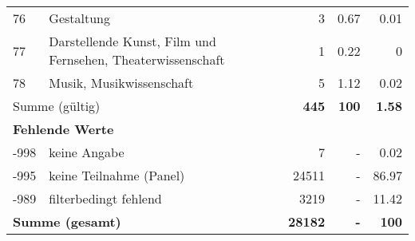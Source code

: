 \begin{longtable}{lXrrr}
        76 & \multicolumn{1}{X}{Gestaltung} & %
          \num{3} &
          \num[round-mode=places,round-precision=2]{0.67} &
          \num[round-mode=places,round-precision=2]{0.01} \\

        77 & \multicolumn{1}{X}{Darstellende Kunst, Film und Fernsehen, Theaterwissenschaft} & %
          \num{1} &
          \num[round-mode=places,round-precision=2]{0.22} &
          \num[round-mode=places,round-precision=2]{0} \\

        78 & \multicolumn{1}{X}{Musik, Musikwissenschaft} & %
          \num{5} &
          \num[round-mode=places,round-precision=2]{1.12} &
          \num[round-mode=places,round-precision=2]{0.02} \\

     \midrule
     \multicolumn{2}{l}{Summe (gültig)} &
       \textbf{\num{445}} &
     \textbf{\num{100}} &
       \textbf{\num[round-mode=places,round-precision=2]{1.58}} \\
     \multicolumn{5}{l}{\textbf{Fehlende Werte}}\\
       -998 &
       keine Angabe &
         \num{7} &
        - &
         \num[round-mode=places,round-precision=2]{0.02} \\
       -995 &
       keine Teilnahme (Panel) &
         \num{24511} &
        - &
         \num[round-mode=places,round-precision=2]{86.97} \\
       -989 &
       filterbedingt fehlend &
         \num{3219} &
        - &
         \num[round-mode=places,round-precision=2]{11.42} \\
     \midrule
     \multicolumn{2}{l}{\textbf{Summe (gesamt)}} &
          \textbf{\num{28182}} &
        \textbf{-} &
        \textbf{\num{100}} \\
     \bottomrule
     \end{longtable}
     
